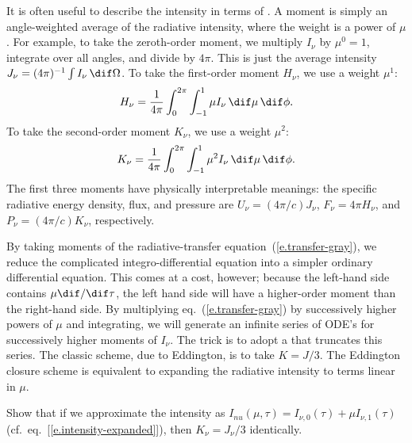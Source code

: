 \begin{sidebar}
\label{sb.intensity-moments}
It is often useful to describe the intensity in terms of . A moment is simply an angle-weighted average of the radiative intensity, where the weight is a power of $\mu$. For example, to take the zeroth-order moment, we multiply $I_{\nu}$ by $\mu^{0}=1$, integrate over all angles, and divide by $4\pi$. This is just the average intensity $J_{\nu} = (4\pi)^{-1}\int I_{\nu}\,\dif\Omega$. To take the first-order moment $H_{\nu}$, we use a weight $\mu^{1}$:
\[
	H_{\nu} = \frac{1}{4\pi}\int_{0}^{2\pi}\int_{-1}^{1}\mu I_{\nu}\,\dif\mu\,\dif\phi.
\]
To take the second-order moment $K_{\nu}$, we use a weight $\mu^{2}$:
\[
	K_{\nu} = \frac{1}{4\pi}\int_{0}^{2\pi}\int_{-1}^{1}\mu^{2} I_{\nu}\,\dif\mu\,\dif\phi.
\]
The first three moments have physically interpretable meanings: the specific radiative energy density, flux, and pressure are $U_{\nu} = (4\pi/c)J_{\nu}$, $F_{\nu} = 4\pi H_{\nu}$, and $P_{\nu} = (4\pi/c) K_{\nu}$, respectively.

By taking moments of the radiative-transfer equation~(\ref{e.transfer-gray}), we reduce the complicated integro-differential equation into a simpler ordinary differential equation. This comes at a cost, however; because the left-hand side contains $\mu\dif/\dif\tau$, the left hand side will have a higher-order moment than the right-hand side. By multiplying eq.~(\ref{e.transfer-gray}) by successively higher powers of $\mu$ and integrating, we will generate an infinite series of ODE's for successively higher moments of $I_{\nu}$.
The trick is to adopt a  that truncates this series. The classic scheme, due to Eddington, is to take $K = J/3$.
The Eddington closure scheme is equivalent to expanding the radiative intensity to terms linear in $\mu$.

\begin{exercisebox}
Show that if we approximate the intensity as $I_{nu}(\mu,\tau) = I_{\nu,0}(\tau) + \mu I_{\nu,1}(\tau)$ (cf.\ eq.~[\ref{e.intensity-expanded}]), then $K_{\nu} = J_{\nu}/3$ identically.
\end{exercisebox}
\end{sidebar}

